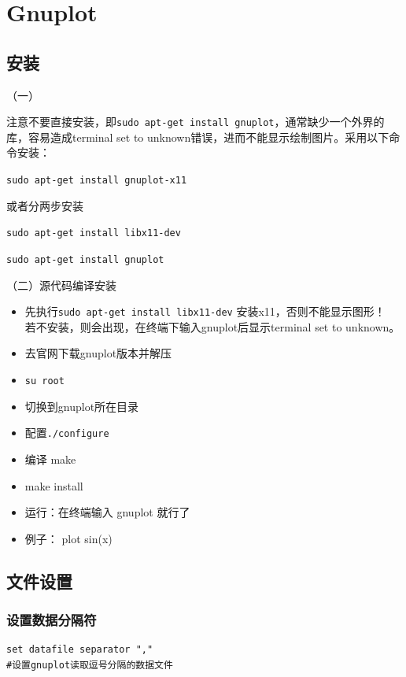 \section{Gnuplot}
\subsection{安装}
（一）

注意不要直接安装，即\verb*|sudo apt-get install gnuplot|，通常缺少一个外界的库，容易造成terminal set to unknown错误，进而不能显示绘制图片。采用以下命令安装：

\verb*|sudo apt-get install gnuplot-x11|

或者分两步安装

\verb*|sudo apt-get install libx11-dev|

\verb*|sudo apt-get install gnuplot|



（二）源代码编译安装
\begin{itemize}
\item 先执行\verb*|sudo apt-get install libx11-dev|  安装x11，否则不能显示图形！\\
若不安装，则会出现，在终端下输入gnuplot后显示terminal set to unknown。

\item 去官网下载gnuplot版本并解压

\item \verb*|su root|

\item 切换到gnuplot所在目录

\item 配置\verb*|./configure|

\item 编译 make

\item  make install

\item 运行：在终端输入 gnuplot 就行了

\item 例子： plot sin(x)
\end{itemize}



\subsection{文件设置}
\subsubsection{设置数据分隔符}
\begin{verbatim}
set datafile separator ","
#设置gnuplot读取逗号分隔的数据文件
\end{verbatim}

